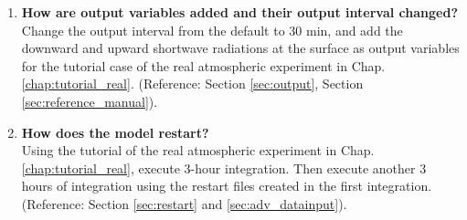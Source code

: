 \begin{enumerate}
\item {\bf How are output variables added and their output interval changed?}\\
Change the output interval from the default to 30 min, and add the downward and upward shortwave radiations at the surface as output variables for the tutorial case of the real atmospheric experiment in Chap. \ref{chap:tutorial_real}. (Reference: Section \ref{sec:output}, Section \ref{sec:reference_manual}).

\item {\bf How does the model restart?}\\
Using the tutorial of the real atmospheric experiment in Chap. \ref{chap:tutorial_real}, execute 3-hour integration. Then execute another 3 hours of integration using the restart files created in the first integration.
(Reference: Section \ref{sec:restart} and \ref{sec:adv_datainput}).


\end{enumerate}


